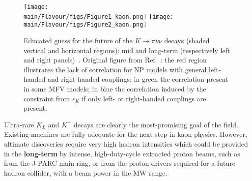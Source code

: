 \begin{figure}
\begin{center}
\texttt{[image: \\main/Flavour/figs/Figure1\_kaon.png]} 
\texttt{[image: \\main/Flavour/figs/Figure2\_kaon.png]} 
\end{center}
\caption{Educated guess for the future of the $K \to \pi \bar \nu \nu$
  decays (shaded vertical and horizontal regions): mid and long-term (respectively  
  left and right 
  panels)~\cite{SozziESPP19}. Original figure 
  from Ref.~\cite{Buras:2015yca}: the red region illustrates the lack of correlation for NP models with general left-handed and right-handed couplings; in green the correlation present in some MFV models; in blue the correlation induced by the constraint from $\epsilon_K$ if only left- or right-handed couplings are present.  
}
\label{fig:Kpinunu.KOTO.NA62}  
\end{figure}


Ultra-rare $K_L$ and $K^+$ decays are clearly the most-promising goal of the field.  Existing machines are fully adequate for the next step in kaon physics. However, ultimate discoveries require very high hadron intensities which could be provided in the {\bf long-term} by intense, high-duty-cycle extracted proton beams, such as from the J-PARC main ring, or from
the proton drivers required for a future hadron collider, with a beam power in the MW range.


